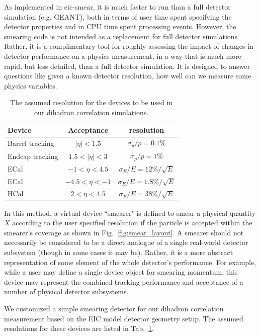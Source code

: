 As implemented in eic-smear, it is much faster to run than a full detector
simulation (e.g. GEANT), both in terms of user time spent specifying the
detector properties and in CPU time spent processing events. However,  the
smearing code is not intended as a replacement for full detector simulations.
Rather, it is a complimentary tool for roughly assessing the impact of changes
in detector performance on a physics measurement, in a way that is much more
rapid, but less detailed, than a full detector simulation. It is designed to
answer questions like given a known detector resolution, how well can we
measure some physics variables. 

\begin{table} 
\centering 
\begin{tabular}{| l | c | c | } \hline
Device	& Acceptance & resolution \\ \hline
Barrel tracking  	&  $|\eta|<1.5$  &  $\sigma_{p}/p=0.1\%$   \\  
Endcap tracking    &  $1.5<|\eta|<3$  &   $\sigma_{p}/p=1\%$   \\  
ECal   & $-1<\eta<4.5$  &  $\sigma_{E}/E=12\%/\sqrt{E}$   \\  
ECal  & $-4.5<\eta<-1$ & $\sigma_{E}/E=1.8\%/\sqrt{E}$   \\ 
HCal  & $2<\eta<4.5$ & $\sigma_{E}/E=38\%/\sqrt{E}$   \\ \hline
\end{tabular} 
\caption[The
assumed resolution for the devices to be used in our dihadron correlation simulations]{The
assumed resolution for the devices to be used in our dihadron correlation simulations.}
\label{tab:EIC_smear} 
\end{table}


In this method, a virtual device ``smearer" is defined to smear a physical
quantity $X$ according to the user specified resolution if the particle is accepted
within the smearer's coverage as shown in Fig.~\ref{fig:smear_layout}. A smearer should not necessarily be considered to
be a direct analogue of a single real-world detector subsystem (though in some
cases it may be). Rather, it is a more abstract representation of some element
of the whole detector's performance. For example, while a user may define a
single device object for smearing momentum, this device may represent the
combined tracking performance and acceptance of a number of physical detector
subsystems.

We customized a simple smearing detector for our dihadron correlation
measurement based on the EIC model detector geometry setup. The assumed
resolutions for these devices are listed in Tab.~\ref{tab:EIC_smear}.




